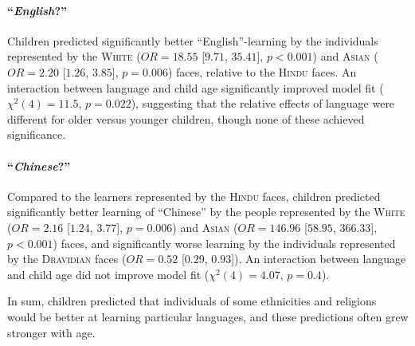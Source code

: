 \documentclass{foushee-adapted-preprint}
\begin{document}
\paragraph{``\textit{English}?''}
Children predicted significantly better ``English''-learning by the individuals represented by the \textsc{White} ($OR=18.55$ [$9.71$, $35.41$], $p<0.001$) and \textsc{Asian} ($OR=2.20$ [$1.26$, $3.85$], $p=0.006$) faces, relative to the \textsc{Hindu} faces. An interaction between language and child age significantly improved model fit ($\chi^{2}(4)=11.5$, $p=0.022$), suggesting that the relative effects of language were different for older versus younger children, though none of these achieved significance.

\paragraph{``\textit{Chinese}?''}
Compared to the learners represented by the \textsc{Hindu} faces, children predicted significantly better learning of ``Chinese'' by the people represented by the \textsc{White} ($OR=2.16$ [$1.24$, $3.77$], $p=0.006$) and \textsc{Asian} ($OR=146.96$ [$58.95$, $366.33$], $p<0.001$) faces, and significantly worse learning by the individuals represented by the \textsc{Dravidian} faces ($OR=0.52$ [$0.29$, $0.93$]). An interaction between language and child age did not improve model fit ($\chi^{2}(4)=4.07$, $p=0.4$).

In sum, children predicted that individuals of some ethnicities and religions would be better at learning particular languages, and these predictions often grew stronger with age. %
\end{document}
